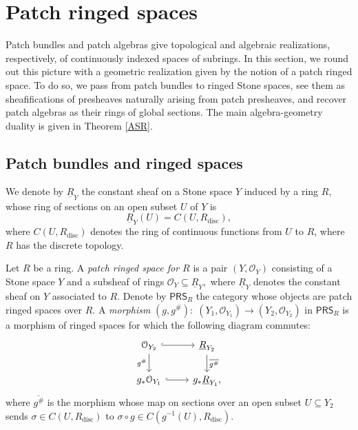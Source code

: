 \documentclass[11pt]{amsart}
\begin{document}
\section[Patch ringed spaces]{Patch ringed spaces}\label{sec: patch ringed spaces}

Patch bundles and patch algebras give topological and algebraic realizations, respectively, of continuously indexed spaces of subrings.  
In this section, we round out this picture with a geometric realization given  by the notion of a patch ringed space.
To do so, we pass from patch bundles to ringed Stone spaces, see them as sheafifications of presheaves naturally arising from patch presheaves, and recover patch algebras as their rings of global sections. The main algebra-geometry duality is given in Theorem \ref{ASR}.

\subsection[Patch bundles and ringed spaces]{Patch bundles and ringed spaces}\label{subsec: patch bundles and ringed spaces} We denote by $\underline R_Y$ the constant sheaf on a Stone space $Y$ induced by a ring $R$, whose ring of sections on an open subset $U$ of $Y$ is   $$\underline R_Y(U)=C(U,R_{\mathrm{disc}}),$$
where $C(U,R_{\mathrm{disc}})$ denotes the ring of continuous functions from $U$ to $R$, where $R$ has the discrete topology.
\begin{definition} \label{patch ringed space def} \label{morphism for PRingSp} 
Let $R$ be a ring. A {\it patch ringed space for $R$} is a pair $(Y,\mathcal O_Y)$ consisting of a Stone space $Y$ and a subsheaf of rings $\mathcal O_Y\subseteq \underline R_Y,$ where $\underline R_Y$ denotes the constant sheaf on $Y$ associated to $R$.
{Denote by $\mathsf{PRS}_R$ the category whose objects are patch ringed spaces over $R$. A {\it morphism}
$(g,g^\#)\colon\; (Y_1,\mathcal O_{Y_1})\to(Y_2,\mathcal O_{Y_2})$ in $\mathsf{PRS}_R$ is a morphism of ringed spaces for which the following diagram commutes:
$$
\begin{tikzcd}
\mathcal O_{Y_2} \arrow[r,hook] \arrow[d,"g^\#"'] & \underline R_{Y_2} \arrow[d,"\overline{g^\#}"] \\
g_*\mathcal O_{Y_1} \arrow[r,hook] & g_*\underline R_{Y_1},
\end{tikzcd}
$$
where $\overline{g^\#}$ is the morphism whose map on sections over an open subset $U\subseteq Y_2$ sends $\sigma\in C(U,R_{\mathrm{disc}})$ to $\sigma\circ g\in C(g^{-1}(U),R_{\mathrm{disc}})$.}
\end{definition}
\end{document}

